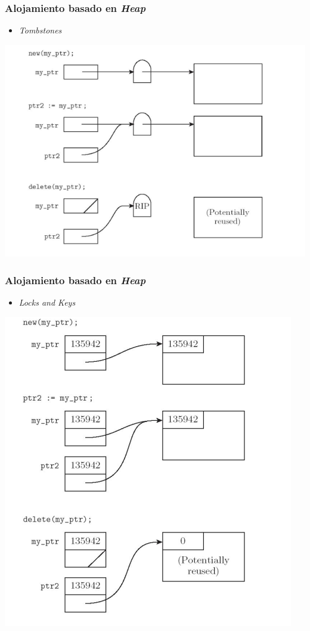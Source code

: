 \documentclass[11pt]{article}
\begin{document}
\subsubsection*{Alojamiento basado en \emph{Heap}}
\label{sec:org75cb0d7}
\begin{itemize}
\item \emph{Tombstones}
\end{itemize}
\begin{center}
\begin{center}
\includegraphics[width=.9\linewidth]{tombstones.png}
\end{center}
\end{center}
\subsubsection*{Alojamiento basado en \emph{Heap}}
\label{sec:org4a02ce7}
\begin{itemize}
\item \emph{Locks and Keys}
\end{itemize}
\begin{center}
\begin{center}
\includegraphics[width=.9\linewidth]{lockskeys.png}
\end{center}
\end{center}
\end{document}
